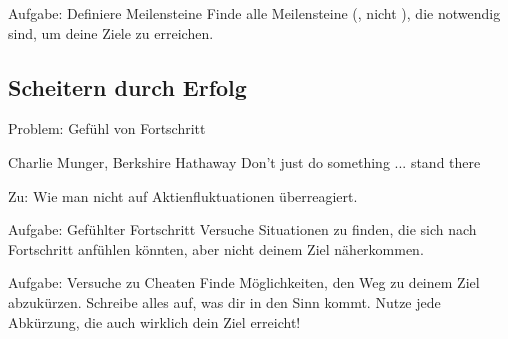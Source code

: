 \begin{frame}[c]
    \begin{block}{Aufgabe: Definiere Meilensteine}
        Finde alle Meilensteine (, nicht ), die
        notwendig sind, um deine Ziele zu erreichen.
    \end{block}
\end{frame}


%
%
%


\subsection{Scheitern durch Erfolg}

\begin{frame}[c]{Problem: Gefühl von Fortschritt}
    \large
    \begin{aquote}{Charlie Munger, Berkshire Hathaway}
        Don’t just do something ... stand there
    \end{aquote}
    \normalsize
    Zu: Wie man nicht auf Aktienfluktuationen überreagiert.
\end{frame}


\begin{frame}[c]
    \vspace{1cm}
    \begin{block}{Aufgabe: Gefühlter Fortschritt}
        Versuche Situationen zu finden, die sich nach Fortschritt anfühlen
        könnten, aber nicht deinem Ziel näherkommen.
    \end{block}
    \vspace{0.5cm}
    \begin{block}{Aufgabe: Versuche zu Cheaten}
        Finde Möglichkeiten, den Weg zu deinem Ziel abzukürzen. Schreibe
        alles auf, was dir in den Sinn kommt. Nutze jede Abkürzung, die auch
        wirklich dein Ziel erreicht!
    \end{block}
\end{frame}


